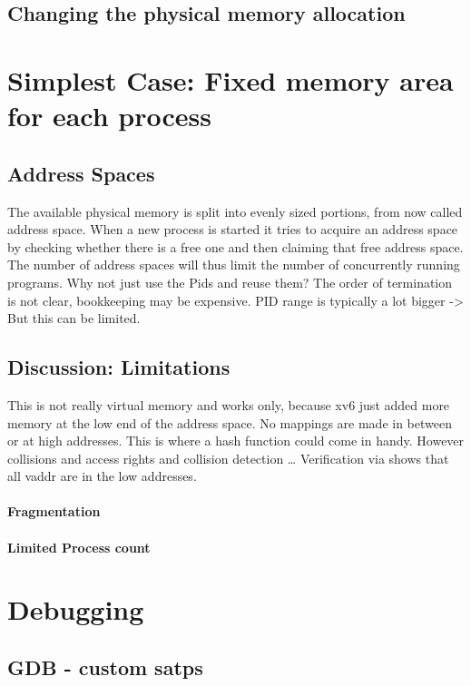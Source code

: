 \subsection*{Changing the physical memory allocation}

\section{Simplest Case: Fixed memory area for each process}
\subsection{Address Spaces}
The available physical memory is split into evenly sized portions, from now called address space.
When a new process is started it tries to acquire an address space by checking whether
there is a free one and then claiming that free address space.
The number of address spaces will thus limit the number of concurrently running programs.
Why not just use the Pids and reuse them? The order of termination is not clear, bookkeeping
may be expensive. PID range is typically a lot bigger -> But this can be limited.
\subsection{Discussion: Limitations}
This is not really virtual memory and works only, because xv6 just added more memory at the low
end of the address space. No mappings are made in between or at high addresses.
This is where a hash function could come in handy. However collisions and access rights and
collision detection \ldots
Verification via %
shows that all vaddr are in the low addresses.
\paragraph*{Fragmentation}
\paragraph*{Limited Process count}




\section{Debugging}
\subsection{ GDB - custom satps}